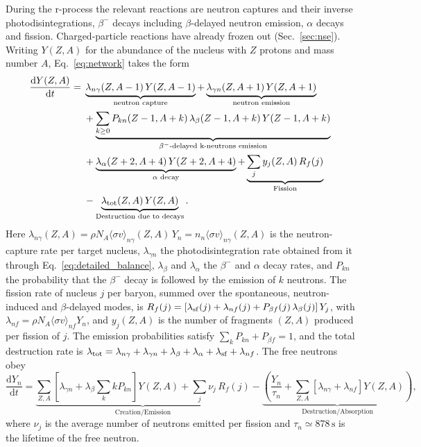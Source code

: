 During the r-process the relevant reactions are neutron captures and their inverse photodisintegrations, $\beta^-$ decays including $\beta$-delayed neutron emission, $\alpha$ decays and fission.
Charged-particle reactions have already frozen out (Sec.~\ref{sec:nse}).
Writing $Y(Z,A)$ for the abundance of the nucleus with $Z$ protons and mass number $A$, Eq.~\ref{eq:network} takes the form
\begin{align}\label{eq:network_r}
  \frac{\mathrm{d}Y(Z,A)}{\mathrm{d}t}=\;&\underbrace{\lambda_{n\gamma}(Z,A-1)\,Y(Z,A-1)}_{\text{neutron capture}}+\underbrace{\lambda_{\gamma n}(Z,A+1)\,Y(Z,A+1)}_{\text{neutron emission}}\nonumber\\
  &+\underbrace{\sum_{k\geq0}P_{kn}(Z-1,A+k)\,\lambda_{\beta}(Z-1,A+k)\,Y(Z-1,A+k)}_{\beta^{-}\text{-delayed k-neutrons emission}}\nonumber\\
  &+\underbrace{\lambda_{\alpha}(Z+2,A+4)\,Y(Z+2,A+4)}_{\alpha\text{ decay}}+\underbrace{\sum_{j}y_j(Z,A)\,R_{f}(j)}_{\text{Fission}}\nonumber\\
  &-\underbrace{\lambda_{\rm tot}(Z,A)\,Y(Z,A)}_{\text{Destruction due to decays}}.
\end{align}
Here $\lambda_{n\gamma}(Z,A)=\rho N_A\langle\sigma v\rangle_{n\gamma}(Z,A)\,Y_n=n_n\langle\sigma v\rangle_{n\gamma}(Z,A)$ is the neutron-capture rate per target nucleus, $\lambda_{\gamma n}$ the photodisintegration rate obtained from it through Eq.~\ref{eq:detailed_balance}, $\lambda_\beta$ and $\lambda_\alpha$ the $\beta^-$ and $\alpha$ decay rates, and $P_{kn}$ the probability that the $\beta^-$ decay is followed by the emission of $k$ neutrons.
The fission rate of nucleus $j$ per baryon, summed over the spontaneous, neutron-induced and $\beta$-delayed modes, is $R_f(j)=[\lambda_{\rm sf}(j)+\lambda_{nf}(j)+P_{\beta f}(j)\,\lambda_\beta(j)]\,Y_j$, with $\lambda_{nf}=\rho N_A\langle\sigma v\rangle_{nf}Y_n$, and $y_j(Z,A)$ is the number of fragments $(Z,A)$ produced per fission of $j$.
The emission probabilities satisfy $\sum_kP_{kn}+P_{\beta f}=1$, and the total destruction rate is $\lambda_{\rm tot}=\lambda_{n\gamma}+\lambda_{\gamma n}+\lambda_\beta+\lambda_\alpha+\lambda_{\rm sf}+\lambda_{nf}$.
The free neutrons obey
\begin{equation}\label{eq:network_n}
  \frac{\mathrm{d}Y_n}{\mathrm{d}t}=\underbrace{\sum_{Z,A}\left[\lambda_{\gamma n}+\lambda_\beta\sum_{k}kP_{kn}\right]Y(Z,A)+\sum_j\nu_j\,R_f(j)}_{\text{Creation/Emission}}-\underbrace{\left(\frac{Y_n}{\tau_n}+\sum_{Z,A}\left[\lambda_{n\gamma}+\lambda_{nf}\right]Y(Z,A)\right)}_{\text{Destruction/Absorption}},
\end{equation}
where $\nu_j$ is the average number of neutrons emitted per fission and $\tau_n\simeq878\,\mathrm{s}$ is the lifetime of the free neutron.

